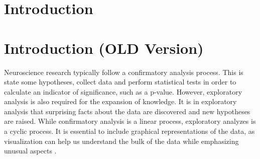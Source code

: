 \documentclass[utf8,paper]{frontiersSCNS} %
\begin{document}




\section{Introduction}








\section{Introduction (OLD Version)}


Neuroscience research typically follow a confirmatory analysis process. This is state some hypotheses, collect data and perform statistical tests in order to calculate an indicator of significance, such as a p-value. However, exploratory analysis \citep{tukey_we_1980} is also required for the expansion of knowledge. It is in exploratory analysis that surprising facts about the data are discovered and new hypotheses are raised. While confirmatory analysis is a linear process, exploratory analyzes is a cyclic process. It is essential to include graphical representations of the data, as visualization can help us understand the bulk of the data while emphasizing unusual aspects \citep{wickham_practical_2008}.
\end{document}
